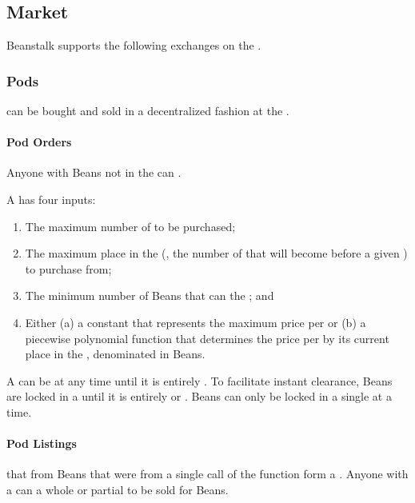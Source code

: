 \documentclass[class=article, crop=false]{standalone}
\begin{document}
\subsection{Market}
Beanstalk supports the following exchanges on the .

\subsubsection{Pods}
 can be bought and sold in a decentralized fashion at the  . 

\paragraph{Pod Orders}

Anyone with Beans not in the  can  . 

A  has four inputs:
\begin{enumerate}
        \item The maximum number of  to be purchased;
        \item The maximum place in the  (, the number of  that will become  before a given ) to purchase from;
        \item The minimum number of Beans that can  the ; and
        \item Either (a) a constant that represents the maximum price per  or (b) a piecewise polynomial function that determines the price per  by its current place in the , denominated in Beans.
\end{enumerate}

A  can be  at any time until it is entirely . To facilitate instant clearance, Beans are locked in a  until it is entirely  or . Beans can only be locked in a single  at a time.

\paragraph{Pod Listings}

 that  from Beans that were  from a single call of the  function form a . Anyone with a  can  a whole or partial  to be sold for Beans.
\end{document}
